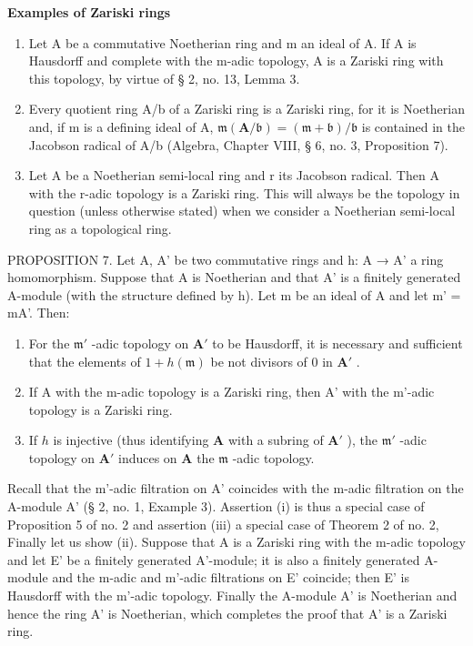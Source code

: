 \textbf{Examples of Zariski rings}\par

\begin{enumerate}
\def\labelenumi{(\arabic{enumi})}
\item
  Let A be a commutative Noetherian ring and m an ideal of A. If A is Hausdorff and complete with the m-adic topology, A is a Zariski ring with this topology, by virtue of § 2, no. 13, Lemma 3.
\item
  Every quotient ring A/b of a Zariski ring is a Zariski ring, for it is Noetherian and, if m is a defining ideal of A, \(\mathfrak{m}(\mathbf{A}/\mathfrak{b}) = (\mathfrak{m} + \mathfrak{b})/\mathfrak{b}\) is contained in the Jacobson radical of A/b (Algebra, Chapter VIII, § 6, no. 3, Proposition 7).
\item
  Let A be a Noetherian semi-local ring and r its Jacobson radical. Then A with the r-adic topology is a Zariski ring. This will always be the topology in question (unless otherwise stated) when we consider a Noetherian semi-local ring as a topological ring.
\end{enumerate}

PROPOSITION 7. Let A, A' be two commutative rings and h: A → A' a ring homomorphism. Suppose that A is Noetherian and that A' is a finitely generated A-module (with the structure defined by h). Let m be an ideal of A and let m' = mA'. Then:

\begin{enumerate}
\def\labelenumi{(\roman{enumi})}
\item
  For the \(\mathfrak{m}'\) -adic topology on \(\mathbf{A}'\) to be Hausdorff, it is necessary and sufficient that the elements of \(1 + h(\mathfrak{m})\) be not divisors of 0 in \(\mathbf{A}'\) .
\item
  If A with the m-adic topology is a Zariski ring, then A' with the m'-adic topology is a Zariski ring.
\item
  If \(h\) is injective (thus identifying \(\mathbf{A}\) with a subring of \(\mathbf{A}'\) ), the \(\mathfrak{m}'\) -adic topology on \(\mathbf{A}'\) induces on \(\mathbf{A}\) the \(\mathfrak{m}\) -adic topology.
\end{enumerate}

Recall that the m'-adic filtration on A' coincides with the m-adic filtration on the A-module A' (§ 2, no. 1, Example 3). Assertion (i) is thus a special case of Proposition 5 of no. 2 and assertion (iii) a special case of Theorem 2 of no. 2, Finally let us show (ii). Suppose that A is a Zariski ring with the m-adic topology and let E' be a finitely generated A'-module; it is also a finitely generated A-module and the m-adic and m'-adic filtrations on E' coincide; then E' is Hausdorff with the m'-adic topology. Finally the A-module A' is Noetherian and hence the ring A' is Noetherian, which completes the proof that A' is a Zariski ring.

